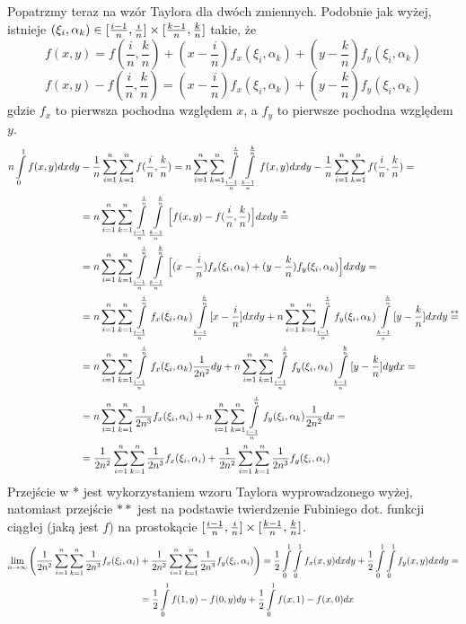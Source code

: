 \documentclass{article}[13pt]
\begin{document}
Popatrzmy teraz na wzór Taylora dla dwóch zmiennych. Podobnie jak wyżej, istnieje $(\xi_i,\alpha_k)\in[{i-1\over n}, \frac in]\times[{k-1\over n}, \frac kn]$ takie, że
$$f(x,y)=f(\frac in, \frac kn)+(x-\frac in)f_x(\xi_i,\alpha_k)+(y-\frac kn)f_y(\xi_i,\alpha_k)$$
$$f(x,y)-f(\frac in,\frac kn)=(x-\frac in)f_x(\xi_i,\alpha_k)+(y-\frac kn)f_y(\xi_i,\alpha_k)$$
gdzie $f_x$ to pierwsza pochodna względem $x$, a $f_y$ to pierwsze pochodna względem $y$.
\begin{align*}
    n\int\limits_0^1f(x,y)dxdy&-\frac1n\sum\limits_{i=1}^n\sum\limits_{k=1}^nf(\frac in, \frac kn)=n\sum\limits_{i=1}^n\sum\limits_{k=1}^n\int\limits_{{i-1\over n}}^\frac in\int\limits_{{k-1\over n}}^\frac knf(x,y)dxdy-\frac1n\sum\limits_{i=1}^n\sum\limits_{k=1}^nf(\frac in,\frac kn)=\\
    &=n\sum\limits_{i=1}^n\sum\limits_{k=1}^n\int\limits_{{i-1\over n}}^\frac in\int\limits_{{k-1\over n}}^\frac kn \Big[f(x,y)-f(\frac in,\frac kn)\Big]dxdy\stackrel{*}{=}\\
    &=n\sum\limits_{i=1}^n\sum\limits_{k=1}^n\int\limits_{{i-1\over n}}^\frac in\int\limits_{{k-1\over n}}^\frac kn\Big[(x-\frac in)f_x(\xi_i,\alpha_k)+(y-\frac kn)f_y(\xi_i,\alpha_k)\Big]dxdy=\\
    &=n\sum\limits_{i=1}^n\sum\limits_{k=1}^n\int\limits_{{i-1\over n}}^\frac inf_x(\xi_i,\alpha_k)\int\limits_{{k-1\over n}}^\frac kn[x-\frac in]dxdy+n\sum\limits_{i=1}^n\sum\limits_{k=1}^n\int\limits_{{i-1\over n}}^\frac inf_y(\xi_i,\alpha_k)\int\limits_{{k-1\over n}}^\frac kn[y-\frac kn]dxdy\stackrel{**}{=}\\
    &=n\sum\limits_{i=1}^n\sum\limits_{k=1}^n\int\limits_{{i-1\over n}}^\frac inf_x(\xi_i,\alpha_k)\frac1{2n^2}dy+n\sum\limits_{i=1}^n\sum\limits_{k=1}^n\int\limits_{{i-1\over n}}^\frac inf_y(\xi_i,\alpha_k)\int\limits_{{k-1\over n}}^\frac kn[y-\frac kn]dydx=\\
    &=n\sum\limits_{i=1}^n\sum\limits_{k=1}^n\frac1{2n^3}f_x(\xi_i,\alpha_i)+n\sum\limits_{i=1}^n\sum\limits_{k=1}^n\int\limits_{{i-1\over n}}^\frac inf_y(\xi_i,\alpha_k)\frac1{2n^2}dx=\\
    &={1\over2n^2}\sum\limits_{i=1}^n\sum\limits_{k=1}^n\frac1{2n^3}f_x(\xi_i,\alpha_i)+{1\over2n^2}\sum\limits_{i=1}^n\sum\limits_{k=1}^n\frac1{2n^3}f_y(\xi_i,\alpha_i)
\end{align*}
Przejście w $*$ jest wykorzystaniem wzoru Taylora wyprowadzonego wyżej, natomiast przejście $**$ jest na podstawie twierdzenie Fubiniego dot. funkcji ciągłej (jaką jest $f$) na prostokącie $[{i-1\over n}, \frac in]\times[{k-1\over n}, \frac kn]$.
\begin{align*}
    \lim\limits_{n\to\infty}\Bigg({1\over2n^2}\sum\limits_{i=1}^n\sum\limits_{k=1}^n\frac1{2n^3}f_x(\xi_i,\alpha_i)&+{1\over2n^2}\sum\limits_{i=1}^n\sum\limits_{k=1}^n\frac1{2n^3}f_y(\xi_i,\alpha_i)\Bigg)=\frac12\int\limits_0^1\int\limits_0^1f_x(x, y)dxdy+\frac12\int\limits_0^1\int\limits_0^1f_y(x,y)dxdy=\\
    &=\frac12\int\limits_0^1f(1,y)-f(0,y)dy+\frac12\int\limits_0^1f(x,1)-f(x,0)dx
\end{align*}
\end{document}
